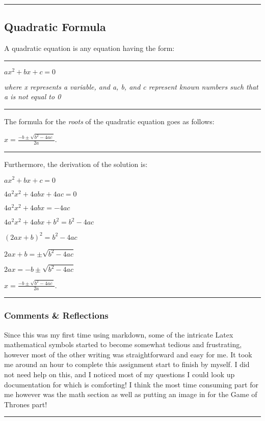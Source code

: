 \documentclass[]{article}
\begin{document}
\begin{center}\rule{0.5\linewidth}{\linethickness}\end{center}

\subsection{Quadratic Formula}\label{quadratic-formula}

A quadratic equation is any equation having the form:

\begin{center}\rule{0.5\linewidth}{\linethickness}\end{center}

\(ax^2 + bx + c = 0\)

\emph{where x represents a variable, and a, b, and c represent known
numbers such that a is not equal to 0}

\begin{center}\rule{0.5\linewidth}{\linethickness}\end{center}

The formula for the \emph{roots} of the quadratic equation goes as
follows:

\(x={\frac {-b\pm {\sqrt {b^{2}-4ac\ }}}{2a}}.\)

\begin{center}\rule{0.5\linewidth}{\linethickness}\end{center}

Furthermore, the derivation of the solution is:

\(ax^2 + bx + c = 0\)

\(4a^2x^2 + 4abx + 4ac = 0\)

\(4a^2x^2 + 4abx = - 4ac\)

\(4a^2x^2 + 4abx + b^2 = b^2 - 4ac\)

\((2ax + b)^2 = b^2 - 4ac\)

\(2ax + b = \pm \sqrt{b^2 - 4ac}\)

\(2ax = -b \pm \sqrt{b^2 - 4ac}\)

\(x= {\frac {-b\pm {\sqrt {b^{2}-4ac\ }}}{2a}}.\)

\begin{center}\rule{0.5\linewidth}{\linethickness}\end{center}

\subsubsection{Comments \& Reflections}\label{comments-reflections}

Since this was my first time using markdown, some of the intricate Latex
mathematical symbols started to become somewhat tedious and frustrating,
however most of the other writing was straightforward and easy for me.
It took me around an hour to complete this assignment start to finish by
myself. I did not need help on this, and I noticed most of my questions
I could look up documentation for which is comforting! I think the most
time consuming part for me however was the math section as well as
putting an image in for the Game of Thrones part!

\begin{center}\rule{0.5\linewidth}{\linethickness}\end{center}
\end{document}
